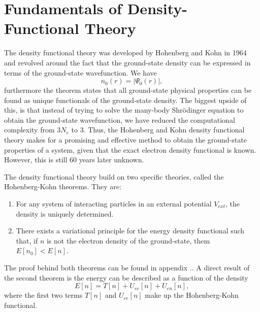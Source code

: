 \section{Fundamentals of Density-Functional Theory}
The density functional theory was developed by Hohenberg and Kohn in 1964 and revolved around the fact that the ground-state density can be expressed in terms of the ground-state wavefunction. We have
\begin{equation}
    n_0(r) = |\Psi_0(r)|,
\end{equation}
furthermore the theorem states that all ground-state physical properties can be found as unique functionals of the ground-state density. The biggest upside of this, is that instead of trying to solve the many-body Shr\"{o}dinger equation to obtain the ground-state wavefunction, we have reduced the computational complexity from $3N_e$ to $3$. Thus, the Hohenberg and Kohn density functional theory makes for a promising and effective method to obtain the ground-state properties of a system, given that the exact electron density functional is known. However, this is still 60 years later unknown. 

The density functional theory build on two specific theories, called the Hohenberg-Kohn theorems. They are:
\begin{enumerate}
    \item For any system of interacting particles in an external potential $V_{ext}$, the density is uniquely determined.
    \item There exists a variational principle for the energy density functional such that, if $n$ is not the electron density of the ground-state, them $E[n_0] < E[n]$.
\end{enumerate}
The proof behind both theorems can be found in appendix .. A direct result of the second theorem is the energy can be described as a function of the density
\begin{equation}
    E[n] = T[n] + U_{ee}[n] + U_{en}[n],
\end{equation}
where the first two terms $T[n]$ and $U_{ee}[n]$ make up the Hohenberg-Kohn functional. 


